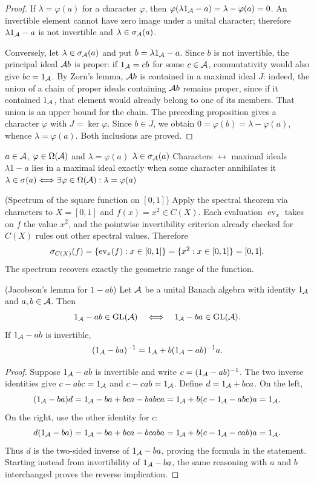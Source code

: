 \begin{proof}[Proof]
If $\lambda=\varphi(a)$ for a character $\varphi$, then
$\varphi(\lambda1_\mathcal A-a)=\lambda-\varphi(a)=0$.
An invertible element cannot have zero image under a unital character;
therefore $\lambda1_\mathcal A-a$ is not invertible and
$\lambda\in\sigma_\mathcal A(a)$.

Conversely, let $\lambda\in\sigma_\mathcal A(a)$ and put
$b=\lambda1_\mathcal A-a$. Since $b$ is not invertible, the principal ideal
$\mathcal A b$ is proper: if $1_\mathcal A=cb$ for some $c\in\mathcal A$,
commutativity would also give $bc=1_\mathcal A$. By Zorn's lemma,
$\mathcal A b$ is contained in a maximal ideal $J$: indeed, the union
of a chain of proper ideals containing $\mathcal A b$ remains
proper, since if it contained $1_\mathcal A$, that element would already belong
to one of its members. That union is an upper bound for the chain.
The preceding proposition gives a character $\varphi$ with $J=\ker\varphi$.
Since $b\in J$, we obtain
$0=\varphi(b)=\lambda-\varphi(a)$, whence
$\lambda=\varphi(a)$. Both inclusions are proved.
\end{proof}

\proofdiagrambranch
{$a\in\mathcal A$, $\varphi\in\Omega(\mathcal A)$ and $\lambda=\varphi(a)$}
{$\lambda\in\sigma_\mathcal A(a)$}
{Characters $\leftrightarrow$ maximal ideals}
{$\lambda1-a$ lies in a maximal ideal exactly when some character annihilates it}
{$\lambda\in\sigma(a)\Longleftrightarrow\exists\varphi\in\Omega(\mathcal A):\lambda=\varphi(a)$}

\begin{cthejemplo}{(Spectrum of the square function on $[0,1]$)}
Apply the spectral theorem via characters to
$X=[0,1]$ and $f(x)=x^2\in C(X)$.
Each evaluation $\operatorname{ev}_x$ takes on $f$ the value $x^2$,
and the pointwise invertibility criterion already checked for $C(X)$
rules out other spectral values. Therefore
\[
 \sigma_{C(X)}(f)
 =\{\operatorname{ev}_x(f):x\in[0,1]\}
 =\{x^2:x\in[0,1]\}=[0,1].
\]
The spectrum recovers exactly the geometric range of the function.
\end{cthejemplo}

\begin{cthproposicion}{(Jacobson's lemma for $1-ab$)}
Let $\mathcal A$ be a unital Banach algebra with identity $1_\mathcal A$ and
$a,b\in\mathcal A$. Then
\[
 1_\mathcal A-ab\in\operatorname{GL}(\mathcal A)\quad\Longleftrightarrow\quad 1_\mathcal A-ba\in\operatorname{GL}(\mathcal A).
\]
If $1_\mathcal A-ab$ is invertible,
\[
 (1_\mathcal A-ba)^{-1}=1_\mathcal A+b(1_\mathcal A-ab)^{-1}a.
\]
\end{cthproposicion}

\begin{proof}[Proof]
Suppose $1_\mathcal A-ab$ is invertible and write
$c=(1_\mathcal A-ab)^{-1}$. The two inverse identities give
$c-abc=1_\mathcal A$ and $c-cab=1_\mathcal A$.
Define $d=1_\mathcal A+bca$. On the left,
\[
 (1_\mathcal A-ba)d
 =1_\mathcal A-ba+bca-babca
 =1_\mathcal A+b(c-1_\mathcal A-abc)a=1_\mathcal A.
\]
On the right, use the other identity for $c$:
\[
 d(1_\mathcal A-ba)
 =1_\mathcal A-ba+bca-bcaba
 =1_\mathcal A+b(c-1_\mathcal A-cab)a=1_\mathcal A.
\]
Thus $d$ is the two-sided inverse of $1_\mathcal A-ba$, proving
the formula in the statement. Starting instead from invertibility of
$1_\mathcal A-ba$, the same reasoning with $a$ and $b$ interchanged
proves the reverse implication.
\end{proof}

